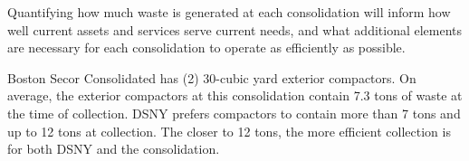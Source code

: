 
    Quantifying how much waste is generated at each consolidation will inform how well current assets and services serve current needs, and what additional elements are necessary for each consolidation to operate as efficiently as possible.
    
    Boston Secor Consolidated has (2) 30-cubic yard exterior compactors. On average, the exterior compactors at this consolidation contain 7.3 tons of waste at the time of collection. DSNY prefers compactors to contain more than 7 tons and up to 12 tons at collection. The closer to 12 tons, the more efficient collection is for both DSNY and the consolidation.